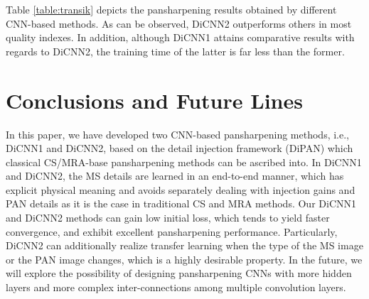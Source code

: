 \documentclass[journal]{IEEEtran}
\begin{document}
Table \ref{table:transik} depicts the pansharpening results obtained by different CNN-based methods. As can be observed, DiCNN2 outperforms others in most quality indexes. In addition, although DiCNN1 attains comparative results with regards to DiCNN2, the training time of the latter is far less than the former.






\section{Conclusions and Future Lines}
\label{sec:Conclusions}

In this paper, we have developed two CNN-based pansharpening methods, i.e., DiCNN1 and DiCNN2, based on the detail injection framework (DiPAN) which classical CS/MRA-base pansharpening methods can be ascribed into. In DiCNN1 and DiCNN2, the MS details are learned in an end-to-end manner, which has explicit physical meaning and avoids separately dealing with injection gains and PAN details as it is the case in traditional CS and MRA methods. Our DiCNN1 and DiCNN2 methods can gain low initial loss, which tends to  yield faster convergence, and exhibit excellent pansharpening performance. Particularly, DiCNN2 can additionally realize transfer learning when the type of the MS image or the PAN image changes, which is a highly desirable property. In the future, we will explore the possibility of designing pansharpening CNNs with more hidden layers and more complex inter-connections among multiple convolution layers.




\ifCLASSOPTIONcaptionsoff
  \newpage
\fi




\end{document}
